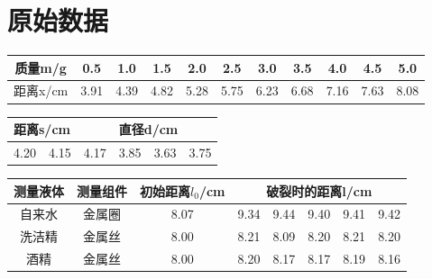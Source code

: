\documentclass[12pt]{ustcreport}
\begin{document}
\section{原始数据}
\begin{table}[H]
    \centering
    \begin{tabular}{|c|c|c|c|c|c|c|c|c|c|c|}
    \hline
    质量m/g  & 0.5  & 1.0  & 1.5  & 2.0  & 2.5  & 3.0  & 3.5  & 4.0  & 4.5  & 5.0  \\ \hline
    距离x/cm & 3.91 & 4.39 & 4.82 & 5.28 & 5.75 & 6.23 & 6.68 & 7.16 & 7.63 & 8.08 \\ \hline
    \end{tabular}
\end{table}
\begin{table}[H]
    \centering
    \begin{tabular}{|lll|lll|}
    \hline
    \multicolumn{3}{|l|}{距离s/cm}                                  & \multicolumn{3}{l|}{直径d/cm}                                  \\ \hline
    \multicolumn{1}{|l|}{4.20} & \multicolumn{1}{l|}{4.15} & 4.17 & \multicolumn{1}{l|}{3.85} & \multicolumn{1}{l|}{3.63} & 3.75 \\ \hline
    \end{tabular}
\end{table}
\begin{table}[H]
    \centering
    \begin{tabular}{|c|c|c|ccccc|}
    \hline
    测量液体 & 测量组件 & 初始距离$l_0$/cm & \multicolumn{5}{c|}{破裂时的距离l/cm}                                                                                      \\ \hline
    自来水  & 金属圈  & 8.07        & \multicolumn{1}{c|}{9.34} & \multicolumn{1}{c|}{9.44} & \multicolumn{1}{c|}{9.40} & \multicolumn{1}{c|}{9.41} & 9.42 \\ \hline
    洗洁精  & 金属丝  & 8.00        & \multicolumn{1}{c|}{8.21} & \multicolumn{1}{c|}{8.09} & \multicolumn{1}{c|}{8.20} & \multicolumn{1}{c|}{8.21} & 8.20 \\ \hline
    酒精   & 金属丝  & 8.00        & \multicolumn{1}{c|}{8.20} & \multicolumn{1}{c|}{8.17} & \multicolumn{1}{c|}{8.17} & \multicolumn{1}{c|}{8.19} & 8.16 \\ \hline
    \end{tabular}
\end{table}
\end{document}
